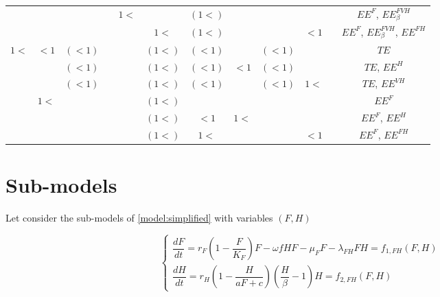 \documentclass{article}
\newcommand{\lf}{\lambda_{FH}}
\begin{document}
\begin{landscape}
\begin{table}
\begin{tabular}{c|c|c|c|c|c|c|c|c|c|c|c}
  \cline{4-11}
   & & & & \multirow{2}{*}{$1<$} & & $(1<)$& & & & & $EE^F$, $EE^{FVH}_\beta$ \\
  & &  & &  & $1<$ & $(1<)$& & &$<1$ & & $EE^F$, $EE^{FVH}_\beta$, $EE^{FH}$ \\
  \hline
\multirow{8}{*}{$1 < $} & \multirow{3}{*}{$<1$} & $(<1)$ & & &$(1<)$ &$(<1)$ & & $(<1)$ & & & $TE$ \\
 &  & $(<1)$ & & &$(1<)$ &$(<1)$ &$<1$ &$(<1)$ & & & $TE$, $EE^H$ \\ 
 &  & $(<1)$ & & &$(1<)$ &$(<1)$ &  &$(<1)$ & $1<$ & & $TE$, $EE^{VH}$ \\
 \cline{2-11}
 & \multirow{3}{*}{$1<$} & & & &$(1<)$ & & & & & & $EE^F$ \\
 & & & & &$(1<)$ &$<1$ & $1<$ & & & & $EE^F$, $EE^H$ \\
 & & & & &$(1<)$ &$1<$ & & & $<1$ & & $EE^F$, $EE^{FH}$ \\
\end{tabular}
\end{table}

\end{landscape}

\section{Sub-models}
Let consider the sub-models of \eqref{model:simplified} with variables $(F,H)$ 

\begin{equation}    
\left\{ \begin{array}{l}
\dfrac{dF}{dt}=r_{F}\left(1-\dfrac{F}{K_{F}}\right)F-\omega f H F - \mu_F F -\lf F H = f_{1, FH} (F,H) \\
\dfrac{dH}{dt}=r_H \left(1-\dfrac{H}{aF + c} \right)  (\dfrac{H}{\beta} - 1) H = f_{2,FH}(F,H)
\end{array}\right.
\label{model:submodelFH}
\end{equation}
\end{document}
